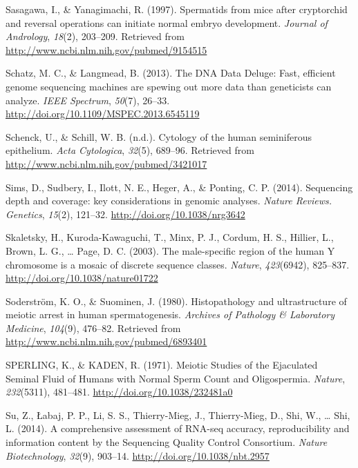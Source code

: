 \documentclass[12pt,twoside]{reedthesis}
\theoremstyle{definition}
\theoremstyle{definition}
\theoremstyle{remark}
\begin{document}
  \hypertarget{ref-Sasagawa}{}
  Sasagawa, I., \& Yanagimachi, R. (1997). Spermatids from mice after
  cryptorchid and reversal operations can initiate normal embryo
  development. \emph{Journal of Andrology}, \emph{18}(2), 203--209.
  Retrieved from \url{http://www.ncbi.nlm.nih.gov/pubmed/9154515}
  
  \hypertarget{ref-Schatz2013}{}
  Schatz, M. C., \& Langmead, B. (2013). The DNA Data Deluge: Fast,
  efficient genome sequencing machines are spewing out more data than
  geneticists can analyze. \emph{IEEE Spectrum}, \emph{50}(7), 26--33.
  \url{http://doi.org/10.1109/MSPEC.2013.6545119}
  
  \hypertarget{ref-Schenck}{}
  Schenck, U., \& Schill, W. B. (n.d.). Cytology of the human seminiferous
  epithelium. \emph{Acta Cytologica}, \emph{32}(5), 689--96. Retrieved
  from \url{http://www.ncbi.nlm.nih.gov/pubmed/3421017}
  
  \hypertarget{ref-Sims2014}{}
  Sims, D., Sudbery, I., Ilott, N. E., Heger, A., \& Ponting, C. P.
  (2014). Sequencing depth and coverage: key considerations in genomic
  analyses. \emph{Nature Reviews. Genetics}, \emph{15}(2), 121--32.
  \url{http://doi.org/10.1038/nrg3642}
  
  \hypertarget{ref-Skaletsky2003}{}
  Skaletsky, H., Kuroda-Kawaguchi, T., Minx, P. J., Cordum, H. S.,
  Hillier, L., Brown, L. G., \ldots{} Page, D. C. (2003). The
  male-specific region of the human Y chromosome is a mosaic of discrete
  sequence classes. \emph{Nature}, \emph{423}(6942), 825--837.
  \url{http://doi.org/10.1038/nature01722}
  
  \hypertarget{ref-Soderstrom1980}{}
  Soderström, K. O., \& Suominen, J. (1980). Histopathology and
  ultrastructure of meiotic arrest in human spermatogenesis.
  \emph{Archives of Pathology \& Laboratory Medicine}, \emph{104}(9),
  476--82. Retrieved from \url{http://www.ncbi.nlm.nih.gov/pubmed/6893401}
  
  \hypertarget{ref-SPERLING1971}{}
  SPERLING, K., \& KADEN, R. (1971). Meiotic Studies of the Ejaculated
  Seminal Fluid of Humans with Normal Sperm Count and Oligospermia.
  \emph{Nature}, \emph{232}(5311), 481--481.
  \url{http://doi.org/10.1038/232481a0}
  
  \hypertarget{ref-Su2014}{}
  Su, Z., Łabaj, P. P., Li, S. S., Thierry-Mieg, J., Thierry-Mieg, D.,
  Shi, W., \ldots{} Shi, L. (2014). A comprehensive assessment of RNA-seq
  accuracy, reproducibility and information content by the Sequencing
  Quality Control Consortium. \emph{Nature Biotechnology}, \emph{32}(9),
  903--14. \url{http://doi.org/10.1038/nbt.2957}
  
\end{document}
